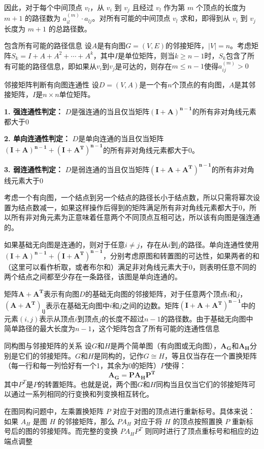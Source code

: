 因此，对于每个中间顶点 $v_l$，从 $v_i$ 到 $v_j$ 且经过 $v_l$ 作为第 $m$ 个顶点的长度为 $m+1$ 的路径数为 $a_{il}^{(m)} \cdot a_{lj}$。对所有可能的中间顶点 $v_l$ 求和，即得到从 $v_i$ 到 $v_j$ 长度为 $m+1$ 的总路径数。
\begin{theorem}{包含所有可能的路径信息}{}
    设$A$是有向图$G=(V,E)$的邻接矩阵，$|V|=n$。考虑矩阵$S_k = I + A + A^2 + \cdots + A^k$，其中$I$是单位矩阵，则当$k \geqslant n-1$时，$S_k$包含了所有可能的路径信息，即如果从$v_i$到$v_j$是可达的，则存在$m \leqslant n-1$使得$a_{ij}^{(m)} > 0$
\end{theorem}
\begin{theorem}{邻接矩阵判断有向图连通性}{}
设$D=(V,A)$是一个有$n$个顶点的有向图，$A$是其邻接矩阵，$I$是$n\times n$单位矩阵。

\textbf{1. 强连通性判定：}
$D$是强连通的当且仅当矩阵$\bm{(I+A)^{n-1}}$的所有非对角线元素都大于0

\textbf{2. 单向连通性判定：}
$D$是单向连通的当且仅当矩阵$\bm{(I+A)^{n-1} + (I+A^T)^{n-1}}$的所有非对角线元素都大于0。


\textbf{3. 弱连通性判定：}
$D$是弱连通的当且仅当矩阵$\bm{(I+A+A^T)^{n-1}}$的所有非对角线元素大于0
\end{theorem}
考虑一个有向图，一个结点到另一个结点的路径长小于结点数，所以只需将幂次设置为结点数减一，如果这样操作后得到的矩阵满足所有非对角线元素都大于0，所以所有非对角元素为正意味着任意两个不同顶点互相可达，所以该有向图是强连通的。

如果基础无向图是连通的，则对于任意$i \neq j$，存在从$i$到$j$的路径。单向连通性使用$\bm{(I+A)^{n-1} + (I+A^T)^{n-1}}$，分别考虑原图和转置图的可达性，如果两者的和（这里可以看作析取，或者布尔和）满足非对角线元素大于0，则表明任意不同的两个结点之间都至少存在一条路径，该图是单向连通的。

矩阵$\bm{A+A^T}$表示有向图$D$的基础无向图的邻接矩阵，对于任意两个顶点$i$和$j$，$\bm{(A+A^T)_{ij}}$表示在基础无向图中$i$和$j$之间的边数。矩阵$\bm{(I+A+A^T)^{n-1}}$中的元素$(i,j)$表示从顶点$i$到顶点$j$的长度不超过$n-1$的路径数。由于基础无向图中简单路径的最大长度为$n-1$，这个矩阵包含了所有可能的连通性信息
\begin{theorem}{同构图与邻接矩阵的关系}{}
设$G$和$H$是两个简单图（有向图或无向图），$\bm{A_G}$和$\bm{A_H}$分别是它们的邻接矩阵。$G$和$H$是同构的，记作$G \cong H$，等且仅当存在一个置换矩阵（每一行和每一列恰好有一个1，其余为0的矩阵）$P$使得：
\[
\bm{A_G = P A_H P^T}
\]
其中$P^T$是$P$的转置矩阵。也就是说，两个图$G$和$H$同构当且仅当它们的邻接矩阵可以通过一系列相同的行变换和列变换相互转化。
\end{theorem}
在图同构问题中，左乘置换矩阵 $P$ 对应于对图的顶点进行重新标号。具体来说：如果 $A_H$ 是图 $H$ 的邻接矩阵，那么 $PA_H$ 对应于将 $H$ 的顶点按照置换 $P$ 重新标号后的图的邻接矩阵。而完整的变换 $PA_HP^T$ 则同时进行了顶点重标号和相应的边端点调整

